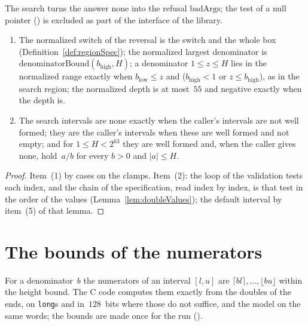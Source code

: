 The search turns the answer none into the refusal $\mathrm{badArgs}$; the test of a null pointer
() is excluded as part of the interface of the library.

\begin{lemma}\label{lem:searchIntervals}
  \leanok
  \begin{enumerate}
    \item The normalized switch of the reversal is the switch and the whole box
      (Definition~\ref{def:regionSpec}); the normalized largest denominator is
      $\mathrm{denominatorBound}(b_{\mathrm{high}}, H)$; a denominator $1 \le z \le H$ lies in the
      normalized range exactly when $b_{\mathrm{low}} \le z$ and ($b_{\mathrm{high}} < 1$ or
      $z \le b_{\mathrm{high}}$), as in the search region; the normalized depth is at most~$55$ and
      negative exactly when the depth is.
    \item The search intervals are none exactly when the caller's intervals are not well formed;
      they are the caller's intervals when these are well formed and not empty; and for
      $1 \le H < 2^{63}$ they are well formed and, when the caller gives none, hold~$a/b$ for every
      $b > 0$ and $|a| \le H$.
  \end{enumerate}
\end{lemma}

\begin{proof}
  \leanok
  Item~(1) by cases on the clamps. Item~(2): the loop of the validation tests each index, and the
  chain of the specification, read index by index, is that test in the order of the values
  (Lemma~\ref{lem:doubleValues}); the default interval by item~(5) of that lemma.
\end{proof}

\section{The bounds of the numerators}\label{sec:numeratorBounds}

For a denominator~$b$ the numerators of an interval $[l, u]$ are $\lceil b l \rceil, \dots,
\lfloor b u \rfloor$ within the height bound. The C code computes them exactly from the doubles of
the ends, on \verb|long|s and in~$128$~bits where those do not suffice, and the model on the same
words; the bounds are made once for the run ().

